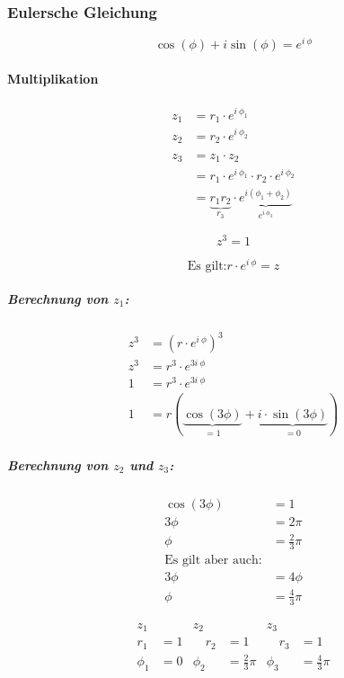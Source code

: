 \subsubsection{Eulersche Gleichung}

\[
	\cos(\phi) + i \sin(\phi) = e^{i\ \phi}
\]

\paragraph{Multiplikation}

\begin{align*}
	z_1 &= r_1 \cdot e^{i\ \phi_1} \\
	z_2 &= r_2 \cdot e^{i\ \phi_2} \\
	\\
	z_3 &= z_1 \cdot z_2 \\
	&= r_1 \cdot e^{i\ \phi_1} \cdot r_2 \cdot e^{i\ \phi_2} \\
	&= \underbrace{r_1 r_2}_{r_3} \cdot \underbrace{e^{i(\phi_1 + \phi_2)}}_{e^{i\ \phi_3}}
\end{align*}

\begin{uebung}
	\begin{aufgabe}
		\[
			z^3 = 1
		\]
	\end{aufgabe}
	\begin{loesungsweg}
		\[
			\text{Es gilt:}
			r \cdot e^{i\ \phi} = z
		\]
		
		\subparagraph{Berechnung von \(z_1\):}
		
		
		\begin{align*}
			z^3 &= {\left(r \cdot e^{i\ \phi}\right)}^3 \\
			z^3 &= r^3 \cdot e^{3 i\ \phi} \\
			1 &= r^3 \cdot e^{3 i\ \phi} \\
			1 &= r(\underbrace{\cos{(3 \phi)}}_{=1} + \underbrace{i \cdot \sin{(3 \phi)}}_{=0})
		\end{align*}
		
		\subparagraph{Berechnung von \(z_2\) und \(z_3\):}
		
		\[
			\begin{alignedat}{1}
				\cos{(3 \phi)} &= 1 \\
				3 \phi &= 2 \pi \\
				\phi &= \frac{2}{3} \pi \\
				\text{Es gilt aber auch:} \\
				3 \phi &= 4 \phi \\
				\phi &= \frac{4}{3} \pi
			\end{alignedat}
		\]
	\end{loesungsweg}
	
	\begin{loesung}
		\[
			\begin{alignedat}{3}
				z_1    &     & z_2       &                   & z_3       &                   \\
				r_1    & = 1 & \quad r_2 & = 1               & \quad r_3 & = 1               \\
				\phi_1 & = 0 & \phi_2    & = \frac{2}{3} \pi & \phi_3    & = \frac{4}{3} \pi 
			\end{alignedat}
		\]
	\end{loesung}
\end{uebung}
